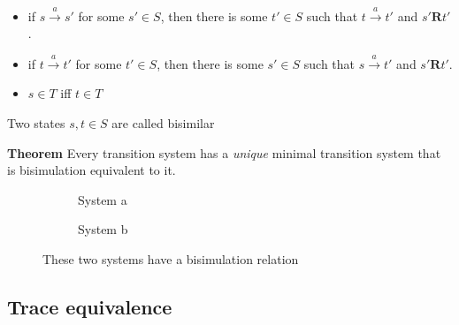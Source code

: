 \begin{itemize}
  \item if \( s \xrightarrow{a} s' \) for some \( s'\in S\), then there is some \( t' \in S \)
  such that \( t \xrightarrow{a} t' \) and \( s'\pmb{R}t' \).
  \item if \( t \xrightarrow{a} t' \) for some \( t'\in S\), then there is some \( s' \in S \)
  such that \( s \xrightarrow{a} t' \) and \( s'\pmb{R}t' \).
  \item \( s \in T \) iff \( t \in T \)
\end{itemize}

Two states \( s,t \in S \) are called bisimilar 


\textbf{Theorem} Every transition system has a \emph{unique} minimal transition system that is
bisimulation equivalent to it.

\begin{figure}[H]
  \centering
  \begin{subfigure}[b]{.45\textwidth}
    \centering
    \caption{System a}
  \end{subfigure}
  \centering
  \begin{subfigure}[b]{.45\textwidth}
    \caption{System b}
  \end{subfigure}
  \caption{These two systems have a bisimulation relation}
\end{figure}

\subsection{Trace equivalence}



